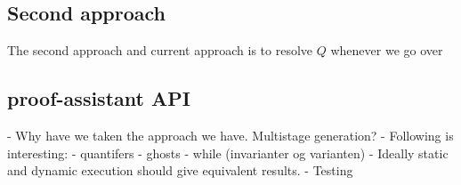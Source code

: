 \subsection{Second approach}
The second approach and current approach is to resolve $Q$ whenever we go over

\subsection{proof-assistant API}

- Why have we taken the approach we have. Multistage generation?
- Following is interesting:
  - quantifers
  - ghosts
  - while (invarianter og varianten)
- Ideally static and dynamic execution should give equivalent results.
- Testing
